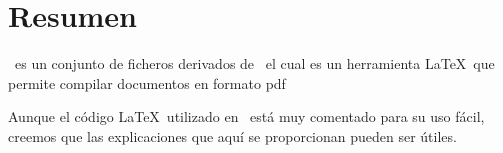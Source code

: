 \chapter{Resumen}



\texumsa\ es un conjunto de ficheros derivados de \texis\ el 
cual es un herramienta  \LaTeX\ 
que permite compilar documentos en formato pdf

Aunque el código \LaTeX\ utilizado en \texis\ está muy comentado
para su uso fácil, creemos que las explicaciones que aquí se
proporcionan pueden ser útiles.

